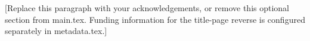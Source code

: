 [Replace this paragraph with your acknowledgements, or remove this optional
section from main.tex. Funding information for the title-page reverse is
configured separately in metadata.tex.]
